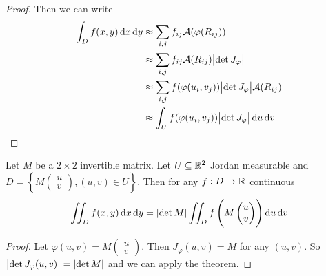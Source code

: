 \documentclass[12pt]{extarticle}
\begin{document}
\begin{proof}
    Then we can write
    \begin{align}
        \int_D f(x, y) \dd{x} \dd{y} & \approx \sum_{i,j} f_{ij} \mathcal A (\varphi(R_{ij}))                         \\
                                     & \approx \sum_{i,j} f_{ij} \mathcal A(R_{ij}) \abs{\det J_\varphi}              \\
                                     & \approx \sum_{i,j} f(\varphi(u_i, v_j)) \abs{\det J_\varphi}\mathcal A(R_{ij}) \\
                                     & \approx \int_U f(\varphi(u_i, v_j)) \abs{\det J_\varphi} \dd{u} \dd{v}
    \end{align}
\end{proof}

\begin{corollary}
    Let $M$ be a $2\times 2$ invertible matrix.
    Let $U \subseteq \mathbb{R}^2$ Jordan measurable and $D = \left\{ M \begin{pmatrix} u \\ v\end{pmatrix}, (u, v) \in U \right\}$.
    Then for any $f: D \to \mathbb{R}$ continuous
    \begin{equation}
        \iint_D f(x, y) \dd{x}\dd{y} = \abs{\det M} \iint_D f\left(M\begin{pmatrix} u \\ v\end{pmatrix}\right) \dd{u} \dd{v}
    \end{equation}
\end{corollary}
\begin{proof}
    Let $\varphi(u, v) = M\begin{pmatrix} u \\ v\end{pmatrix}$. Then $J_\varphi(u, v) = M$ for any $(u, v)$.
    So $\abs{\det J_\varphi (u, v)} = \abs{\det M}$ and we can apply the theorem.
\end{proof}
\end{document}
